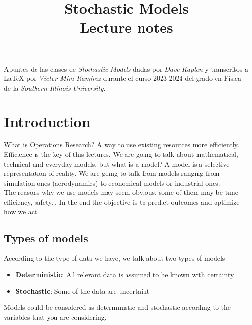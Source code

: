 \documentclass{report}
\title{\Huge{Stochastic Models\\Lecture notes}}
\author{}
\date{\number\year}
\begin{document}
\maketitle
\clearpage
\noindent Apuntes de las clases de \textit{Stochastic Models} dadas por \textit{Dave Kaplan} y transcritos a \LaTeX
\hspace{0cm} por \textit{Víctor Mira Ramírez} durante el curso 2023-2024 del grado en Física de la \textit{Southern Illinois University}.
\pagebreak
\tableofcontents
\pagebreak

\chapter{Introduction}
  \noindent What is Operations Research? A way to use existing resources more efficiently. Efficience is the key of this lectures. We are going to talk about mathematical, technical and everyday models, but what is a model? A model is a selective representation of reality. We are going to talk from models ranging from simulation ones (aerodynamics) to economical models or industrial ones. \\

  \noindent The reasons why we use models may seem obvious, some of them may be time efficiency, safety... In the end the objective is to predict outcomes and optimize how we act.

  \section{Types of models}
    According to the type of data we have, we talk about two types of models
        \begin{itemize}
            \item \textbf{Deterministic}: All relevant data is assumed to be known with certainty.
            \item \textbf{Stochastic}: Some of the data are uncertaint
        \end{itemize}
    Models could be considered as deterministic and stochastic according to the variables that you are considering.
\end{document}
